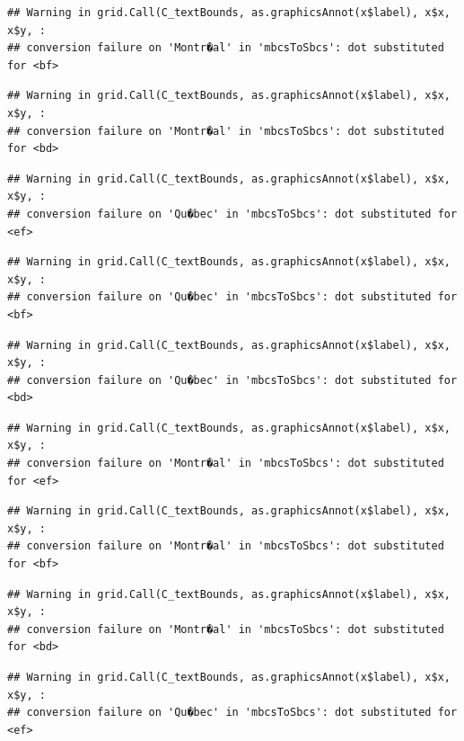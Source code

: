 \documentclass[]{article}
\begin{document}
\begin{verbatim}
## Warning in grid.Call(C_textBounds, as.graphicsAnnot(x$label), x$x, x$y, :
## conversion failure on 'Montr�al' in 'mbcsToSbcs': dot substituted for <bf>
\end{verbatim}

\begin{verbatim}
## Warning in grid.Call(C_textBounds, as.graphicsAnnot(x$label), x$x, x$y, :
## conversion failure on 'Montr�al' in 'mbcsToSbcs': dot substituted for <bd>
\end{verbatim}

\begin{verbatim}
## Warning in grid.Call(C_textBounds, as.graphicsAnnot(x$label), x$x, x$y, :
## conversion failure on 'Qu�bec' in 'mbcsToSbcs': dot substituted for <ef>
\end{verbatim}

\begin{verbatim}
## Warning in grid.Call(C_textBounds, as.graphicsAnnot(x$label), x$x, x$y, :
## conversion failure on 'Qu�bec' in 'mbcsToSbcs': dot substituted for <bf>
\end{verbatim}

\begin{verbatim}
## Warning in grid.Call(C_textBounds, as.graphicsAnnot(x$label), x$x, x$y, :
## conversion failure on 'Qu�bec' in 'mbcsToSbcs': dot substituted for <bd>
\end{verbatim}

\begin{verbatim}
## Warning in grid.Call(C_textBounds, as.graphicsAnnot(x$label), x$x, x$y, :
## conversion failure on 'Montr�al' in 'mbcsToSbcs': dot substituted for <ef>
\end{verbatim}

\begin{verbatim}
## Warning in grid.Call(C_textBounds, as.graphicsAnnot(x$label), x$x, x$y, :
## conversion failure on 'Montr�al' in 'mbcsToSbcs': dot substituted for <bf>
\end{verbatim}

\begin{verbatim}
## Warning in grid.Call(C_textBounds, as.graphicsAnnot(x$label), x$x, x$y, :
## conversion failure on 'Montr�al' in 'mbcsToSbcs': dot substituted for <bd>
\end{verbatim}

\begin{verbatim}
## Warning in grid.Call(C_textBounds, as.graphicsAnnot(x$label), x$x, x$y, :
## conversion failure on 'Qu�bec' in 'mbcsToSbcs': dot substituted for <ef>
\end{verbatim}
\end{document}
